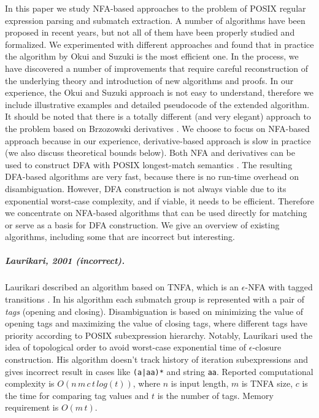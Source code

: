 \documentclass[AMA,STIX1COL]{WileyNJD-v2}
\begin{document}
In this paper we study NFA-based approaches to the problem of POSIX regular expression parsing and submatch extraction.
A number of algorithms have been proposed in recent years,
but not all of them have been properly studied and formalized.
We experimented with different approaches and found that in practice the algorithm by Okui and Suzuki \cite{OS13} is the most efficient one.
In the process, we have discovered a number of improvements
that require careful reconstruction of the underlying theory and introduction of new algorithms and proofs.
In our experience, the Okui and Suzuki approach is not easy to understand,
therefore we include illustrative examples and detailed pseudocode of the extended algorithm.
%
It should be noted that there is a totally different (and very elegant) approach to the problem
based on Brzozowski derivatives \cite{SL14}.
We choose to focus on NFA-based approach because
in our experience, derivative-based approach is slow in practice
(we also discuss theoretical bounds below).
%
Both NFA and derivatives can be used to construct DFA with POSIX longest-match semantics \cite{SL13} \cite{Bor15} \cite{Tro17}.
The resulting DFA-based algorithms are very fast, because there is no run-time overhead on disambiguation.
However, DFA construction is not always viable due to its exponential worst-case complexity,
and if viable, it needs to be efficient.
Therefore we concentrate on NFA-based algorithms
that can be used directly for matching or serve as a basis for DFA construction.
We give an overview of existing algorithms, including some that are incorrect but interesting.

\subparagraph{Laurikari, 2001 (incorrect).}

Laurikari described an algorithm based on TNFA, which is an $\epsilon$-NFA with tagged transitions \cite{Lau01}.
In his algorithm each submatch group is represented with a pair of \emph{tags} (opening and closing).
Disambiguation is based on minimizing the value of opening tags and maximizing the value of closing tags, where
different tags have priority according to POSIX subexpression hierarchy.
Notably, Laurikari used the idea of topological order to avoid worst-case exponential time of $\epsilon$-closure construction.
His algorithm doesn't track history of iteration subexpressions and gives incorrect result in cases like \texttt{(a|aa)*} and string \texttt{aa}.
Reported computational complexity is $O(n \, m \, c \, t \, log(t))$, where
$n$ is input length,
$m$ is TNFA size,
$c$ is the time for comparing tag values
and $t$ is the number of tags.
Memory requirement is $O(m \, t)$.
\end{document}
